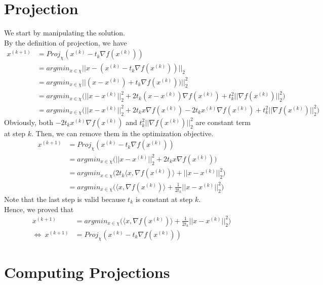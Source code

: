 \documentclass[11pt,a4paper]{article}
\begin{document}
\section{Projection}
We start by manipulating the solution. \\
By the definition of projection, we have 
\begin{align}
    x^{(k+1)} &= Proj_{\chi}(x^{(k)} - t_k \nabla f(x^{(k)})) \\
    &= argmin_{x\in \chi} || x - (x^{(k)} - t_k \nabla f(x^{(k)}) ) ||_2 \\
    &= argmin_{x\in \chi} || (x - x^{(k)}) + t_k \nabla f(x^{(k)}) ) ||_2^2 \\
    &= argmin_{x\in \chi} \big( || x - x^{(k)} ||_2^2 
       + 2 t_k (x - x^{(k)} ) \nabla f(x^{(k)}) 
       + t_k^2 || \nabla f(x^{(k)}) ||_2^2  \big) \\
    &= argmin_{x\in \chi} \big( || x - x^{(k)} ||_2^2 
       + 2 t_k x \nabla f(x^{(k)}) - 2 t_k x^{(k)}\nabla f(x^{(k)})   
       + t_k^2 || \nabla f(x^{(k)}) ||_2^2  \big)
\end{align}
Obviously, both $- 2 t_k x^{(k)}\nabla f(x^{(k)})$ and $t_k^2 || \nabla f(x^{(k)})
||_2^2$ are constant term at step $k$. Then, we can remove them in the optimization
objective.
\begin{align}
    x^{(k+1)} &= Proj_{\chi}(x^{(k)} - t_k \nabla f(x^{(k)})) \\
    &= argmin_{x\in \chi} \big( || x - x^{(k)} ||_2^2 
    + 2 t_k x \nabla f(x^{(k)})  \big) \\
    &= argmin_{x\in \chi} \big(  
     2 t_k \langle x, \nabla f(x^{(k)}) \rangle + || x - x^{(k)} ||_2^2 \big) \\
    &= argmin_{x\in \chi} \big(  \langle x, \nabla f(x^{(k)}) \rangle
    + \frac{1}{2t_k} || x - x^{(k)} ||_2^2 \big)
\end{align}
Note that the last step is valid because $t_k$ is constant at step $k$. \\
Hence, we proved that 
\begin{align}
x^{(k+1)} &= argmin_{x\in \chi} \big(  \langle x, \nabla f(x^{(k)}) \rangle
    + \frac{1}{2t_k} || x - x^{(k)} ||_2^2 \big) \\
    \Longleftrightarrow\ x^{(k+1)} &= Proj_{\chi}(x^{(k)} - t_k \nabla f(x^{(k)})) 
\end{align}
\newpage
\section{Computing Projections}
\newcommand{\Rpn}{\mathbb{R}_+^n}
\newcommand{\Spn}{S_+^n}
\end{document}
